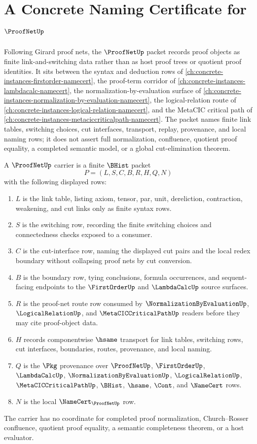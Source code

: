 \chapter{A Concrete Naming Certificate for $\ProofNetUp$}
\label{ch:concrete-instances-proof-net-namecert}

Following Girard proof nets, the $\ProofNetUp$ packet records proof objects as finite link-and-switching data rather than as host proof trees or quotient proof identities. It sits between the syntax and deduction rows of \autoref{ch:concrete-instances-firstorder-namecert}, the proof-term corridor of \autoref{ch:concrete-instances-lambdacalc-namecert}, the normalization-by-evaluation surface of \autoref{ch:concrete-instances-normalization-by-evaluation-namecert}, the logical-relation route of \autoref{ch:concrete-instances-logical-relation-namecert}, and the MetaCIC critical path of \autoref{ch:concrete-instances-metaciccriticalpath-namecert}. The packet names finite link tables, switching choices, cut interfaces, transport, replay, provenance, and local naming rows; it does not assert full normalization, confluence, quotient proof equality, a completed semantic model, or a global cut-elimination theorem.

\begin{definition}
\label{def:proof-net-carrier}
A $\ProofNetUp$ carrier is a finite $\BHist$ packet
$$
P=(L,S,C,B,R,H,Q,N)
$$
with the following displayed rows:
\begin{enumerate}
\item $L$ is the link table, listing axiom, tensor, par, unit, dereliction, contraction, weakening, and cut links only as finite syntax rows.
\item $S$ is the switching row, recording the finite switching choices and connectedness checks exposed to a consumer.
\item $C$ is the cut-interface row, naming the displayed cut pairs and the local redex boundary without collapsing proof nets by cut conversion.
\item $B$ is the boundary row, tying conclusions, formula occurrences, and sequent-facing endpoints to the $\FirstOrderUp$ and $\LambdaCalcUp$ source surfaces.
\item $R$ is the proof-net route row consumed by $\NormalizationByEvaluationUp$, $\LogicalRelationUp$, and $\MetaCICCriticalPathUp$ readers before they may cite proof-object data.
\item $H$ records componentwise $\hsame$ transport for link tables, switching rows, cut interfaces, boundaries, routes, provenance, and local naming.
\item $Q$ is the $\Pkg$ provenance over $\ProofNetUp$, $\FirstOrderUp$, $\LambdaCalcUp$, $\NormalizationByEvaluationUp$, $\LogicalRelationUp$, $\MetaCICCriticalPathUp$, $\BHist$, $\hsame$, $\Cont$, and $\NameCert$ rows.
\item $N$ is the local $\NameCert_{\ProofNetUp}$ row.
\end{enumerate}
The carrier has no coordinate for completed proof normalization, Church--Rosser confluence, quotient proof equality, a semantic completeness theorem, or a host evaluator.
\end{definition}

